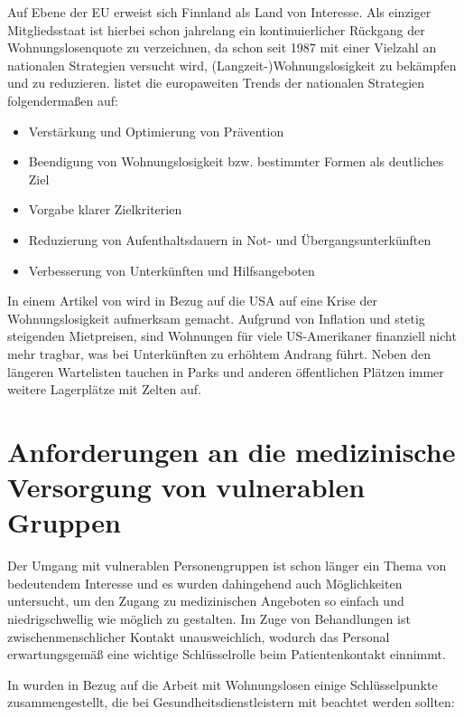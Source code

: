 Auf Ebene der EU erweist sich Finnland als Land von Interesse. Als einziger Mitgliedsstaat ist hierbei schon jahrelang ein kontinuierlicher Rückgang der Wohnungslosenquote zu verzeichnen, da schon seit 1987 mit einer Vielzahl an nationalen Strategien versucht wird, (Langzeit-)Wohnungslosigkeit zu bekämpfen und zu reduzieren. \citet{Busch-Geertsema.2012} listet die europaweiten Trends der nationalen Strategien folgendermaßen auf:

\begin{itemize}
	\item Verstärkung und Optimierung von Prävention
	\item Beendigung von Wohnungslosigkeit bzw. bestimmter Formen als deutliches Ziel
	\item Vorgabe klarer Zielkriterien
	\item Reduzierung von Aufenthaltsdauern in Not- und Übergangsunterkünften
	\item Verbesserung von Unterkünften und Hilfsangeboten
\end{itemize}

In einem Artikel von \citet{Lopez.2022} wird in Bezug auf die USA auf eine Krise der Wohnungslosigkeit aufmerksam gemacht. Aufgrund von Inflation und stetig steigenden Mietpreisen, sind Wohnungen für viele US-Amerikaner finanziell nicht mehr tragbar, was bei Unterkünften zu erhöhtem Andrang führt. Neben den längeren Wartelisten tauchen in Parks und anderen öffentlichen Plätzen immer weitere Lagerplätze mit Zelten auf.


\section[Anforderungen an die medizinische Versorgung]{Anforderungen an die medizinische Versorgung von vulnerablen Gruppen}\label{sec:reqMedCare}

Der Umgang mit vulnerablen Personengruppen ist schon länger ein Thema von bedeutendem Interesse und es wurden dahingehend auch Möglichkeiten untersucht, um den Zugang zu medizinischen Angeboten so einfach und niedrigschwellig wie möglich zu gestalten. Im Zuge von Behandlungen ist zwischenmenschlicher Kontakt unausweichlich, wodurch das Personal erwartungsgemäß eine wichtige Schlüsselrolle beim Patientenkontakt einnimmt.

In \citet{Hwang.2014} wurden in Bezug auf die Arbeit mit Wohnungslosen einige Schlüsselpunkte zusammengestellt, die bei Gesundheitsdienstleistern mit beachtet werden sollten:

